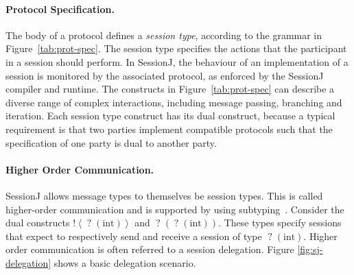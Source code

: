 \documentclass[10pt]{llncs}
\begin{document}
\paragraph{Protocol Specification.}

The body of a protocol defines a \textit{session type}, according to the grammar in Figure~\ref{tab:prot-spec}.
The session type specifies the actions that the participant in a session should perform. In SessionJ, the behaviour of an implementation of a session is monitored by the associated protocol, as enforced by the SessionJ compiler and runtime. %
The constructs in Figure~\ref{tab:prot-spec} can describe a diverse range of complex interactions, including message passing, branching and iteration. Each session type construct has its dual construct, because a typical requirement is that two parties implement compatible protocols such that the specification of one party is dual to another party.



\paragraph{Higher Order Communication.}

SessionJ allows message types to themselves be session types. This is called higher-order communication and is supported by using subtyping~\cite{higher-order-comm}.
Consider the dual constructs $\mathopen{!}\left<\mathopen{?}\left(\text{int}\right)\right>$ and $\mathopen{?}\left(\mathopen{?}\left(\text{int}\right)\right)$. 
These types specify sessions that expect to respectively send and receive a session of type $\mathopen{?}\left(\text{int}\right)$.
Higher order communication is often referred to a session delegation. Figure \ref{fig:sj-delegation} shows a basic delegation scenario.
\end{document}
